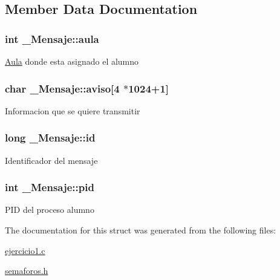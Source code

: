 \subsection{Member Data Documentation}
\hypertarget{struct__Mensaje_a47abc67c07fe0d5eaf709a4a9ad59129}{
\subsubsection[{aula}]{\setlength{\rightskip}{0pt plus 5cm}int \+\_\+\+Mensaje\+::aula}}\label{struct__Mensaje_a47abc67c07fe0d5eaf709a4a9ad59129}
\hyperlink{structAula}{Aula} donde esta asignado el alumno \hypertarget{struct__Mensaje_a89a493b8d3c3e803d637fbdcfbd1bdab}{
\subsubsection[{aviso}]{\setlength{\rightskip}{0pt plus 5cm}char \+\_\+\+Mensaje\+::aviso\mbox{[}4 $\ast$1024+1\mbox{]}}}\label{struct__Mensaje_a89a493b8d3c3e803d637fbdcfbd1bdab}
Informacion que se quiere transmitir \hypertarget{struct__Mensaje_a216a370cde3eae04df6a81fea5bef338}{
\subsubsection[{id}]{\setlength{\rightskip}{0pt plus 5cm}long \+\_\+\+Mensaje\+::id}}\label{struct__Mensaje_a216a370cde3eae04df6a81fea5bef338}
Identificador del mensaje \hypertarget{struct__Mensaje_a4980e5d47c0feeda94157d1fdbac9fe6}{
\subsubsection[{pid}]{\setlength{\rightskip}{0pt plus 5cm}int \+\_\+\+Mensaje\+::pid}}\label{struct__Mensaje_a4980e5d47c0feeda94157d1fdbac9fe6}
P\+I\+D del proceso alumno 

The documentation for this struct was generated from the following files\+:\begin{DoxyCompactItemize}
\item 
\hyperlink{ejercicio1_8c}{ejercicio1.\+c}\item 
\hyperlink{semaforos_8h}{semaforos.\+h}\end{DoxyCompactItemize}
